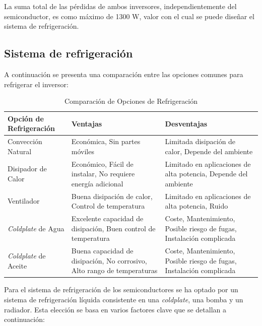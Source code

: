 La suma total de las pérdidas de ambos inversores, independientemente del semiconductor, es como máximo de 1300 W, valor con el cual se puede diseñar el sistema de refrigeración.

\subsection{Sistema de refrigeración}

A continuación se presenta una comparación entre las opciones comunes para refrigerar el inversor:

\begin{table}[H]
	\centering
	\begin{tabular}{|p{2.5cm}|p{5cm}|p{5cm}|}
		\hline
		\textbf{Opción de Refrigeración} & \textbf{Ventajas} & \textbf{Desventajas} \\ \hline
		Convección Natural & Económica, Sin partes móviles & Limitada disipación de calor, Depende del ambiente \\ \hline
		Disipador de Calor & Económico, Fácil de instalar, No requiere energía adicional & Limitado en aplicaciones de alta potencia, Depende del ambiente \\ \hline
		Ventilador & Buena disipación de calor, Control de temperatura & Limitado en aplicaciones de alta potencia, Ruido \\ \hline
		\textit{Coldplate} de Agua & Excelente capacidad de disipación, Buen control de temperatura & Coste, Mantenimiento, Posible riesgo de fugas, Instalación complicada \\ \hline
		\textit{Coldplate} de Aceite & Buena capacidad de disipación, No corrosivo, Alto rango de temperaturas &  Coste, Mantenimiento, Posible riesgo de fugas, Instalación complicada \\ \hline
	\end{tabular}
	\caption{Comparación de Opciones de Refrigeración}
\end{table}



Para el sistema de refrigeración de los semiconductores se ha optado por un sistema de refrigeración líquida consistente en una \textit{coldplate}, una bomba y un radiador. Esta elección se basa en varios factores clave que se detallan a continuación:

